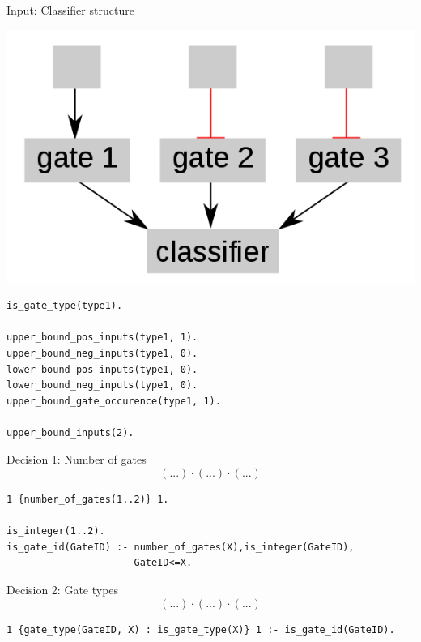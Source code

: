 \documentclass[10pt,dvipsnames]{beamer}
\begin{document}
\begin{frame}[fragile]{Input: Classifier structure}
\begin{center}
\includegraphics[scale=0.25]{classifier.png}
\end{center}
\vspace{0.3cm}

\begin{verbatim}
is_gate_type(type1).

upper_bound_pos_inputs(type1, 1). 
upper_bound_neg_inputs(type1, 0). 
lower_bound_pos_inputs(type1, 0). 
lower_bound_neg_inputs(type1, 0). 
upper_bound_gate_occurence(type1, 1). 
 
upper_bound_inputs(2).
\end{verbatim}

\end{frame}


\begin{frame}[fragile]{Decision 1: Number of gates}
\[(...)\cdot(...)\cdot(...)\]
\small
\begin{verbatim}
1 {number_of_gates(1..2)} 1.

is_integer(1..2).
is_gate_id(GateID) :- number_of_gates(X),is_integer(GateID), 
                      GateID<=X.
\end{verbatim}
\end{frame}


\begin{frame}[fragile]{Decision 2: Gate types}
\[(...)\cdot(...)\cdot(...)\]
\small
\begin{verbatim}
1 {gate_type(GateID, X) : is_gate_type(X)} 1 :- is_gate_id(GateID).
\end{verbatim}
\end{frame}
\end{document}

